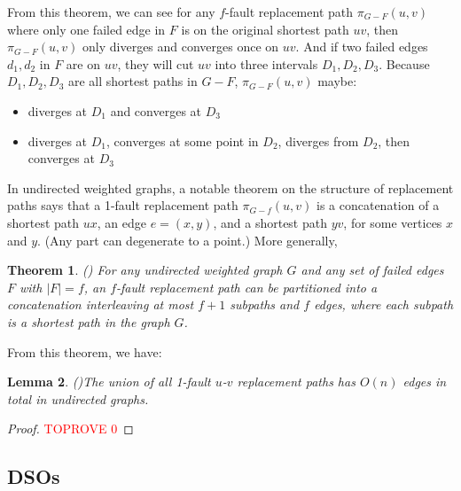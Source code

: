 \documentclass[11pt]{article}
\theoremstyle{plain}
\newtheorem{theorem}{Theorem}[section]
\newtheorem{lemma}[theorem]{Lemma}
\theoremstyle{definition}
\newcommand{\og}[3]{\pi_{G-#3}\left(#1,#2\right)}
\begin{document}
From this theorem, we can see for any $f$-fault replacement path $\og{u}{v}{F}$ where only one failed edge in $F$ is on the original shortest path $uv$, then $\og{u}{v}{F}$ only diverges and converges once on $uv$. And if two failed edges $d_1,d_2$ in $F$ are on $uv$, they will cut $uv$ into three intervals $D_1,D_2,D_3$. Because $D_1,D_2,D_3$ are all shortest paths in $G-F$, $\og{u}{v}{F}$ maybe:
\begin{itemize}
    \item diverges at $D_1$ and converges at $D_3$
    \item diverges at $D_1$, converges at some point in $D_2$, diverges from $D_2$, then converges at $D_3$
\end{itemize}






In undirected weighted graphs, a notable theorem on the structure of replacement paths says that a 1-fault replacement path $\og{u}{v}{f}$ is a concatenation of a shortest path $ux$, an edge $e=(x,y)$, and a shortest path $yv$, for some vertices $x$ and $y.$ (Any part can degenerate to a point.) More generally,

\begin{theorem} (\cite{2001Restoration}) \label{ReplacementPath}
For any undirected weighted graph $G$ and any set of failed edges $F$ with $|F|=f$, an $f$-fault replacement path can be partitioned into a concatenation interleaving at most $f+1$ subpaths and $f$ edges, where each subpath is a shortest path in the graph $G$. 
\end{theorem}

From this theorem, we have:
\begin{lemma}(\cite{BodwinGPW17})\label{thm:n-edges}
    The union of all 1-fault $u$-$v$ replacement paths has $O(n)$ edges in total in undirected graphs.
\end{lemma}
\begin{proof}\textcolor{red}{TOPROVE 0}\end{proof}







\subsection{DSOs}\label{sec:intro-dso}
\end{document}

